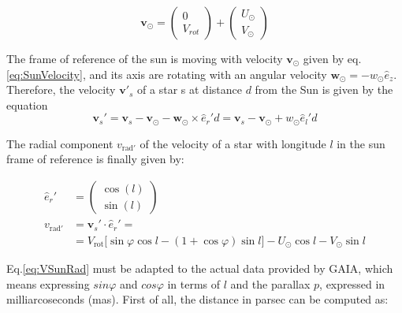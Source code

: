 \begin{equation}\label{eq:VSun}
    \bm{v}_{\odot} = \begin{pmatrix} 0 \\ V_{rot} \end{pmatrix} + \begin{pmatrix} U_{\odot} \\ V_{\odot} \end{pmatrix}
\end{equation}
 
\noindent
The frame of reference of the sun is moving with velocity $\bm{v}_{\odot}$ given by eq.\ref{eq:SunVelocity}, and its axis are rotating with an angular velocity $\bm{w}_{\odot} = -w_{\odot} \hat{e}_z$. Therefore, the velocity $\bm{v'}_s$ of a star s at distance $d$ from the Sun is given by the equation
\begin{equation}\label{eq:ReferenceFrame}
    \bm{v}_s' = \bm{v}_s - \bm{v}_{\odot} - \bm{w}_{\odot} \times \hat{e}_r' d = \bm{v}_s - \bm{v}_{\odot} + w_{\odot} \hat{e}_l' d
\end{equation}

\noindent 
The radial component $v_{\text{rad}'}$ of the velocity of a star with longitude $l$ in the sun frame of reference is finally given by:

\begin{equation}\label{eq:VSunRad}
    \begin{aligned}
        \hat{e}_r' &= \begin{pmatrix} \cos(l) \\ \sin(l) \end{pmatrix} \\
        v_{\text{rad}'}  &= \bm{v}_s' \cdot \hat{e}_r' = \\ 
        &=V_{\text{rot}} \biggl[ \sin\varphi \cos l - (1 + \cos\varphi)\sin l \biggr] - U_{\odot} \cos l - V_{\odot} \sin l
    \end{aligned}
\end{equation}
\noindent




Eq.\ref{eq:VSunRad} must be adapted to the actual data provided by GAIA, which means expressing $sin\varphi$ and $cos\varphi$ in terms of $l$ and the parallax $p$, expressed in milliarcoseconds (\unit{mas}). First of all, the distance in parsec can be computed as:

